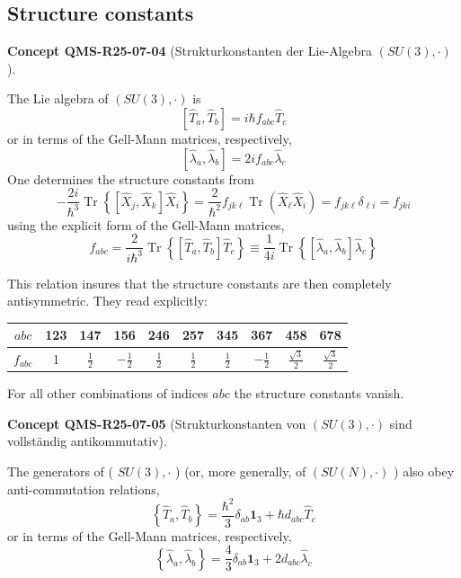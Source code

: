 \documentclass[10pt, letterpaper]{article}
\newcommand{\CustomHeading}[3]{%
  \par\medskip\noindent%
  \textbf{#1 #2} \textnormal{(#3)}.\enskip%
}
\newenvironment{CONC}[2]{\begin{unitbox}\CustomHeading{Concept}{#1}{#2}}{\end{unitbox}}
\begin{document}
\subsection{Structure constants}



\begin{CONC}{QMS-R25-07-04}{Strukturkonstanten der Lie-Algebra $(S U(3), \cdot)$}
The Lie algebra of $(S U(3), \cdot)$ is
$$
\left[\hat{T}_{a}, \hat{T}_{b}\right]=i \hbar f_{a b c} \hat{T}_{c}
$$
or in terms of the Gell-Mann matrices, respectively,
$$
\left[\hat{\lambda}_{a}, \hat{\lambda}_{b}\right]=2 i f_{a b c} \hat{\lambda}_{c}
$$
One determines the structure constants from
$$-\frac{2 i}{\hbar^3} \operatorname{Tr}\left\{\left[\hat{X}_j, \hat{X}_k\right] \hat{X}_i\right\}=\frac{2}{\hbar^2} f_{j k \ell} \operatorname{Tr}\left(\hat{X}_{\ell} \hat{X}_i\right)=f_{j k \ell} \delta_{\ell i}=f_{j k i}$$
using the explicit form of the Gell-Mann matrices,
$$
f_{a b c}=\frac{2}{i \hbar^{3}} \operatorname{Tr}\left\{\left[\hat{T}_{a}, \hat{T}_{b}\right] \hat{T}_{c}\right\} \equiv \frac{1}{4 i} \operatorname{Tr}\left\{\left[\hat{\lambda}_{a}, \hat{\lambda}_{b}\right] \hat{\lambda}_{c}\right\}
$$

This relation insures that the structure constants are then completely antisymmetric. They read explicitly:
\begin{center}
\begin{tabular}{c||c|c|c|c|c|c|c|c|c}
$a b c$ & 123 & 147 & 156 & 246 & 257 & 345 & 367 & 458 & 678 \\
\hline
$f_{a b c}$ & 1 & $\frac{1}{2}$ & $-\frac{1}{2}$ & $\frac{1}{2}$ & $\frac{1}{2}$ & $\frac{1}{2}$ & $-\frac{1}{2}$ & $\frac{\sqrt{3}}{2}$ & $\frac{\sqrt{3}}{2}$ \\
\hline
\end{tabular}
\end{center}
For all other combinations of indices $a b c$ the structure constants vanish.
\end{CONC}



\begin{CONC}{QMS-R25-07-05}{Strukturkonstanten von $(S U(3), \cdot)$ sind vollständig antikommutativ}
The generators of ( $S U(3), \cdot$ ) (or, more generally, of $(S U(N), \cdot)$ ) also obey anti-commutation relations,
$$
\left\{\hat{T}_{a}, \hat{T}_{b}\right\}=\frac{\hbar^{2}}{3} \delta_{a b} \mathbf{1}_{3}+\hbar d_{a b c} \hat{T}_{c}
$$
or in terms of the Gell-Mann matrices, respectively,
$$
\left\{\hat{\lambda}_{a}, \hat{\lambda}_{b}\right\}=\frac{4}{3} \delta_{a b} \mathbf{1}_{3}+2 d_{a b c} \hat{\lambda}_{c}
$$
\end{CONC}
\end{document}
